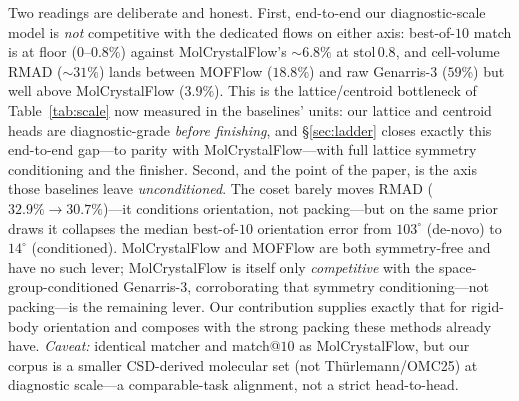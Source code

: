 \documentclass[journal=acsodf,manuscript=article]{achemso}
\begin{document}
Two readings are deliberate and honest. First, end-to-end our diagnostic-scale
model is \emph{not} competitive with the dedicated flows on either axis:
best-of-$10$ match is at floor ($0$--$0.8\%$) against MolCrystalFlow's $\sim\!6.8\%$
at $\text{stol}\,0.8$, and cell-volume RMAD ($\sim\!31\%$) lands between MOFFlow
($18.8\%$) and raw Genarris-3 ($59\%$) but well above MolCrystalFlow ($3.9\%$).
This is the lattice/centroid bottleneck of Table~\ref{tab:scale} now measured in
the baselines' units: our lattice and centroid heads are diagnostic-grade
\emph{before finishing}, and \S\ref{sec:ladder} closes exactly this end-to-end
gap---to parity with MolCrystalFlow---with full lattice symmetry conditioning and
the finisher. Second, and the point of the paper, is the axis those baselines leave
\emph{unconditioned}. The coset barely moves RMAD ($32.9\%\!\to\!30.7\%$)---it
conditions orientation, not packing---but on the same prior draws it collapses the
median best-of-$10$ orientation error from $103^\circ$ (de-novo) to $14^\circ$
(conditioned). MolCrystalFlow and MOFFlow are both symmetry-free and have no such
lever; MolCrystalFlow is itself only \emph{competitive} with the
space-group-conditioned Genarris-3, corroborating that symmetry conditioning---not
packing---is the remaining lever. Our contribution supplies exactly that for
rigid-body orientation and composes with the strong packing these methods already
have. \emph{Caveat:} identical matcher and match@$10$ as MolCrystalFlow, but our
corpus is a smaller CSD-derived molecular set (not Th\"urlemann/OMC25) at diagnostic
scale---a comparable-task alignment, not a strict head-to-head.
\end{document}
